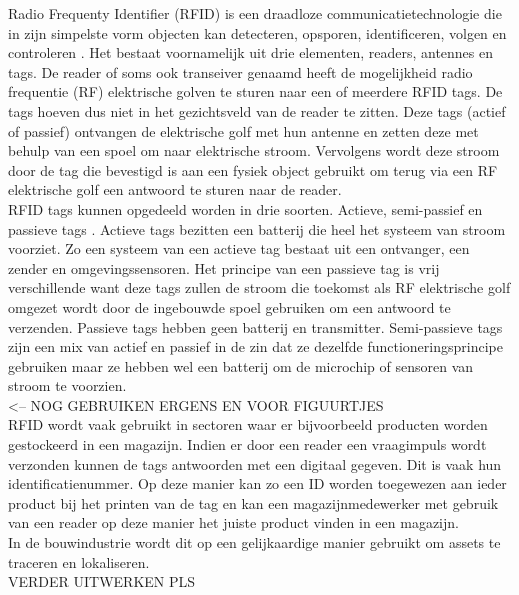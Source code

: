 Radio Frequenty Identifier (RFID)  is een draadloze communicatietechnologie die in zijn simpelste vorm objecten kan detecteren, opsporen, identificeren, volgen en controleren \autocite{Tan2022}. Het bestaat voornamelijk uit drie elementen, readers, antennes en tags. De reader of soms ook transeiver genaamd heeft de mogelijkheid radio frequentie (RF) elektrische golven te sturen naar een of meerdere RFID tags. De tags hoeven dus niet in het gezichtsveld van de reader te zitten. Deze tags (actief of passief) ontvangen de elektrische golf met hun antenne en zetten deze met behulp van een spoel om naar elektrische stroom. Vervolgens wordt deze stroom door de tag die bevestigd is aan een fysiek object gebruikt om terug via een RF elektrische golf een antwoord te sturen naar de reader.\\

RFID tags kunnen opgedeeld worden in drie soorten. Actieve, semi-passief en passieve tags \autocite{Mezzanotte2021}.  Actieve tags bezitten een batterij die heel het systeem van stroom voorziet. Zo een systeem van een actieve tag bestaat uit een ontvanger, een zender en omgevingssensoren. Het principe van een passieve tag is vrij verschillende want deze tags zullen de stroom die toekomst als RF elektrische golf omgezet wordt door de ingebouwde spoel gebruiken om een antwoord te verzenden. Passieve tags hebben geen batterij en transmitter. Semi-passieve tags zijn een mix van actief en passief in de zin dat ze dezelfde functioneringsprincipe gebruiken maar ze hebben wel een batterij om de microchip of sensoren van stroom te voorzien.\\

\autocite{Roberts2006} <-- NOG GEBRUIKEN ERGENS EN VOOR FIGUURTJES\\

RFID wordt vaak gebruikt in sectoren waar er bijvoorbeeld producten worden gestockeerd in een magazijn. Indien er door een reader een vraagimpuls wordt verzonden kunnen de tags antwoorden met een digitaal gegeven. Dit is vaak hun identificatienummer. Op deze manier kan zo een ID worden toegewezen aan ieder product bij het printen van de tag en kan een magazijnmedewerker met gebruik van een reader op deze manier het juiste product vinden in een magazijn.\\

In de bouwindustrie wordt dit op een gelijkaardige manier gebruikt om assets te traceren en lokaliseren.\\

 VERDER UITWERKEN PLS

